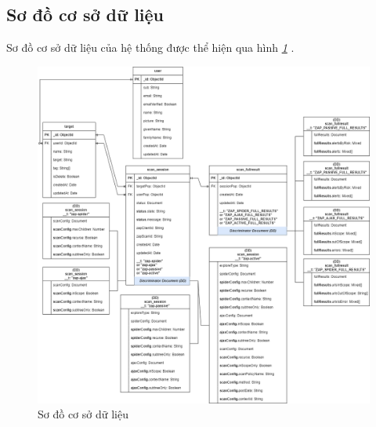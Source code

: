 \newpage
\subsection{Sơ đồ cơ sở dữ liệu}

Sơ đồ cơ sở dữ liệu của hệ thống được thể hiện qua hình \textit{\ref{fig:Database} }.

\begin{figure}[H]
      \centering
      \includegraphics[width=\textwidth]{applied-thesis-chapters/chapter-3/Sơ đồ cơ sở dữ liệu.png}
      \caption{Sơ đồ cơ sở dữ liệu}
      \label{fig:Database}
\end{figure}